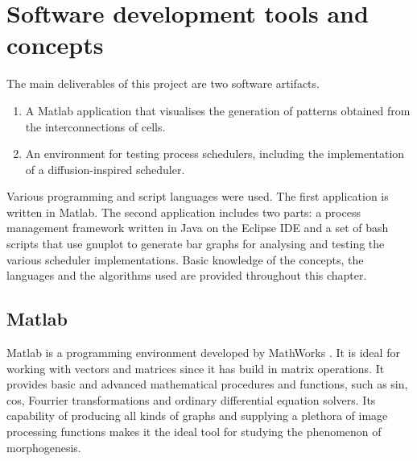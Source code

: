 \chapter{Software development tools and concepts}
\label{progB}
The main deliverables of this project are two software artifacts.
\begin{enumerate} 
\item A Matlab application that visualises the generation of patterns obtained from the interconnections of cells.
\item An environment for testing process schedulers, including the implementation of a diffusion-inspired scheduler.
\end{enumerate}
Various programming and script languages were used. The first application is written in Matlab. The second application includes two parts: a process management framework written in Java on the Eclipse IDE and a set of bash scripts that use gnuplot \cite{gnuplot} to generate bar graphs for analysing and testing the various scheduler implementations.
Basic knowledge of the concepts, the languages and the algorithms used are provided throughout this chapter.  
	
\section{Matlab}
    
Matlab is a programming environment developed by MathWorks \cite{MATLAB_2010}. It is ideal for working with vectors and matrices since it has build in matrix operations. It provides basic and advanced mathematical procedures and functions, such as sin, cos, Fourrier transformations and ordinary differential equation solvers. Its capability of producing all kinds of graphs and supplying a plethora of image processing functions makes it the ideal tool for studying the phenomenon of morphogenesis.

